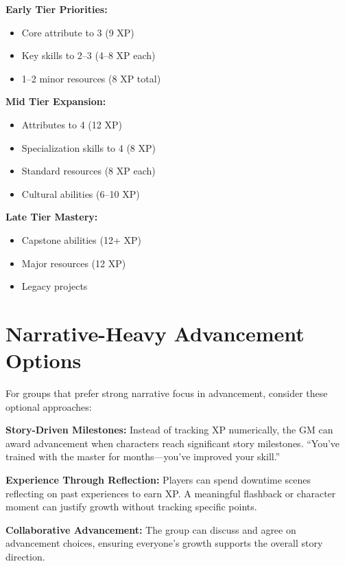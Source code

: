 \documentclass[11pt,twoside,openany]{book}
\begin{document}
\begin{tcolorbox}[colback=gray!5!white, colframe=gray!75!black, title=XP Planning Guide, fonttitle=\bfseries,breakable]
\textbf{Early Tier Priorities:}
\begin{itemize}
\item Core attribute to 3 (9 XP)
\item Key skills to 2--3 (4--8 XP each)
\item 1--2 minor resources (8 XP total)
\end{itemize}

\textbf{Mid Tier Expansion:}
\begin{itemize}
\item Attributes to 4 (12 XP)
\item Specialization skills to 4 (8 XP)
\item Standard resources (8 XP each)
\item Cultural abilities (6--10 XP)
\end{itemize}

\textbf{Late Tier Mastery:}
\begin{itemize}
\item Capstone abilities (12+ XP)
\item Major resources (12 XP)
\item Legacy projects
\end{itemize}
\end{tcolorbox}

\section*{Narrative-Heavy Advancement Options} 

For groups that prefer strong narrative focus in advancement, consider these optional approaches:

\textbf{Story-Driven Milestones:} Instead of tracking XP numerically, the GM can award advancement when characters reach significant story milestones. ``You've trained with the master for months---you've improved your skill.''

\textbf{Experience Through Reflection:} Players can spend downtime scenes reflecting on past experiences to earn XP. A meaningful flashback or character moment can justify growth without tracking specific points.

\textbf{Collaborative Advancement:} The group can discuss and agree on advancement choices, ensuring everyone's growth supports the overall story direction.
\end{document}
